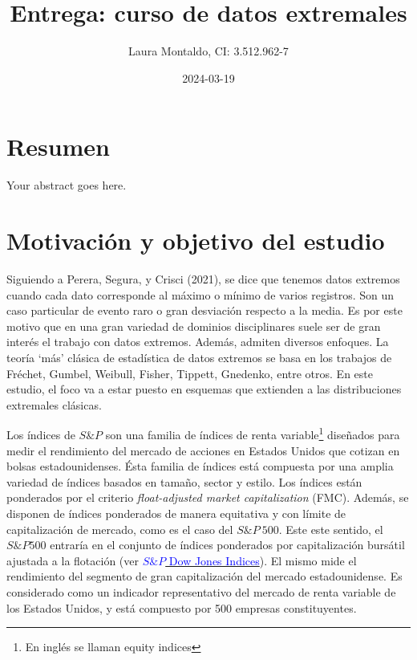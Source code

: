 \documentclass[
  oneside]{article}
\title{Entrega: curso de datos extremales}
\author{Laura Montaldo, CI: 3.512.962-7}
\date{2024-03-19}
\begin{document}
\maketitle

\newtheorem{theorem}{Teorema}[section]

\newpage

\thispagestyle{empty}

\maketitle

\newpage

\tableofcontents

\newpage

\hypertarget{resumen}{%
\section{Resumen}\label{resumen}}

Your abstract goes here.

\newpage

\section{Motivación y objetivo del estudio}

Siguiendo a Perera, Segura, y Crisci (2021), se dice que tenemos datos
extremos cuando cada dato corresponde al máximo o mínimo de varios
registros. Son un caso particular de evento raro o gran desviación
respecto a la media. Es por este motivo que en una gran variedad de
dominios disciplinares suele ser de gran interés el trabajo con datos
extremos. Además, admiten diversos enfoques. La teoría `más' clásica de
estadística de datos extremos se basa en los trabajos de Fréchet,
Gumbel, Weibull, Fisher, Tippett, Gnedenko, entre otros. En este
estudio, el foco va a estar puesto en esquemas que extienden a las
distribuciones extremales clásicas.

Los índices de \(S\&P\) son una familia de índices de renta
variable\footnote{En inglés se llaman equity indices} diseñados para
medir el rendimiento del mercado de acciones en Estados Unidos que
cotizan en bolsas estadounidenses. Ésta familia de índices está
compuesta por una amplia variedad de índices basados en tamaño, sector y
estilo. Los índices están ponderados por el criterio
\textit{float-adjusted market capitalization} (FMC). Además, se disponen
de índices ponderados de manera equitativa y con límite de
capitalización de mercado, como es el caso del \(S\&P\:500\). Este este
sentido, el \(S\&P 500\) entraría en el conjunto de índices ponderados
por capitalización bursátil ajustada a la flotación (ver
\href{http://www.overleaf.com}{\textcolor{blue}{$S\&P$ Dow Jones Indices}}).
El mismo mide el rendimiento del segmento de gran capitalización del
mercado estadounidense. Es considerado como un indicador representativo
del mercado de renta variable de los Estados Unidos, y está compuesto
por 500 empresas constituyentes.
\end{document}
